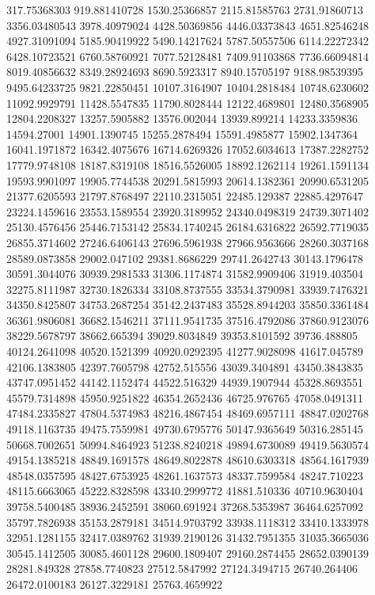 \documentclass[draft=on]{scrbook}
\begin{document}
317.75368303
919.881410728
1530.25366857
2115.81585763
2731.91860713
3356.03480543
3978.40979024
4428.50369856
4446.03373843
4651.82546248
4927.31091094
5185.90419922
5490.14217624
5787.50557506
6114.22272342
6428.10723521
6760.58760921
7077.52128481
7409.91103868
7736.66094814
8019.40856632
8349.28924693
8690.5923317
8940.15705197
9188.98539395
9495.64233725
9821.22850451
10107.3164907
10404.2818484
10748.6230602
11092.9929791
11428.5547835
11790.8028444
12122.4689801
12480.3568905
12804.2208327
13257.5905882
13576.002044
13939.899214
14233.3359836
14594.27001
14901.1390745
15255.2878494
15591.4985877
15902.1347364
16041.1971872
16342.4075676
16714.6269326
17052.6034613
17387.2282752
17779.9748108
18187.8319108
18516.5526005
18892.1262114
19261.1591134
19593.9901097
19905.7744538
20291.5815993
20614.1382361
20990.6531205
21377.6205593
21797.8768497
22110.2315051
22485.129387
22885.4297647
23224.1459616
23553.1589554
23920.3189952
24340.0498319
24739.3071402
25130.4576456
25446.7153142
25834.1740245
26184.6316822
26592.7719035
26855.3714602
27246.6406143
27696.5961938
27966.9563666
28260.3037168
28589.0873858
29002.047102
29381.8686229
29741.2642743
30143.1796478
30591.3044076
30939.2981533
31306.1174874
31582.9909406
31919.403504
32275.8111987
32730.1826334
33108.8737555
33534.3790981
33939.7476321
34350.8425807
34753.2687254
35142.2437483
35528.8944203
35850.3361484
36361.9806081
36682.1546211
37111.9541735
37516.4792086
37860.9123076
38229.5678797
38662.665394
39029.8034849
39353.8101592
39736.488805
40124.2641098
40520.1521399
40920.0292395
41277.9028098
41617.045789
42106.1383805
42397.7605798
42752.515556
43039.3404891
43450.3843835
43747.0951452
44142.1152474
44522.516329
44939.1907944
45328.8693551
45579.7314898
45950.9251822
46354.2652436
46725.976765
47058.0491311
47484.2335827
47804.5374983
48216.4867454
48469.6957111
48847.0202768
49118.1163735
49475.7559981
49730.6795776
50147.9365649
50316.285145
50668.7002651
50994.8464923
51238.8240218
49894.6730089
49419.5630574
49154.1385218
48849.1691578
48649.8022878
48610.6303318
48564.1617939
48548.0357595
48427.6753925
48261.1637573
48337.7599584
48247.710223
48115.6663065
45222.8328598
43340.2999772
41881.510336
40710.9630404
39758.5400485
38936.2452591
38060.691924
37268.5353987
36464.6257092
35797.7826938
35153.2879181
34514.9703792
33938.1118312
33410.1333978
32951.1281155
32417.0389762
31939.2190126
31432.7951355
31035.3665036
30545.1412505
30085.4601128
29600.1809407
29160.2874455
28652.0390139
28281.849328
27858.7740823
27512.5847992
27124.3494715
26740.264406
26472.0100183
26127.3229181
25763.4659922
\end{document}
